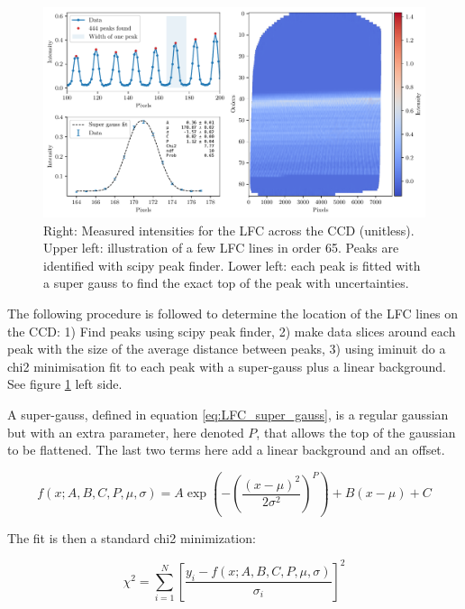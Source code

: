     \begin{figure}%
        \begin{wide}  
            \includegraphics[width=\textwidth]{figures/LFC_peak_fitting_overview.pdf}
            \caption{Right: Measured intensities for the LFC across the CCD (unitless). Upper left: illustration of a few LFC lines in order 65. Peaks are identified with scipy peak finder. Lower left: each peak is fitted with a super gauss to find the exact top of the peak with uncertainties.}
            \label{fig:LFC_CCD}
        \end{wide}
    \end{figure}

    The following procedure is followed to determine the location of the LFC lines on the CCD: 1) Find peaks using scipy peak finder, 2) make data slices around each peak with the size of the average distance between peaks, 3) using iminuit do a chi2 minimisation fit to each peak with a super-gauss plus a linear background. See figure \ref{fig:LFC_CCD} left side.

    A super-gauss, defined in equation \ref{eq:LFC_super_gauss}, is a regular gaussian but with an extra parameter, here denoted $P$, that allows the top of the gaussian to be flattened. The last two terms here add a linear background and an offset. 
    
    \begin{equation}
        \label{eq:LFC_super_gauss}
        f(x ; A, B, C, P, \mu, \sigma) = A \exp \left(-\left(\frac{\left(x-\mu\right)^{2}}{2 \sigma^{2}}\right)^{P}\right) + B(x-\mu) + C
    \end{equation}

    The fit is then a standard chi2 minimization:

    \begin{equation}
        \label{eq:chi2_super_gauss}
        \chi^{2}=\sum_{i=1}^{N}\left[\frac{y_{i}-f(x ; A, B, C, P, \mu, \sigma)}{\sigma_{i}}\right]^{2}
    \end{equation}

